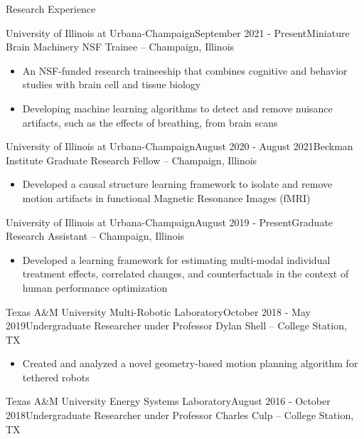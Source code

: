 \documentclass{resume} %
\begin{document}
\begin{rSection}{Research Experience}
\begin{rSubsection}{University of Illinois at Urbana-Champaign}{September 2021 - Present}{Miniature Brain Machinery NSF Trainee -- Champaign, Illinois} 

\begin{itemize}
    \item An NSF-funded research traineeship that combines cognitive and behavior studies with brain cell and tissue biology
    \item Developing machine learning algorithms to detect and remove nuisance artifacts, such as the effects of breathing, from brain scans
\end{itemize}
\end{rSubsection}
\begin{rSubsection}{University of Illinois at Urbana-Champaign}{August 2020 - August 2021}{Beckman Institute Graduate Research Fellow -- Champaign, Illinois} 

\begin{itemize}
    \item Developed a causal structure learning framework to isolate and remove motion artifacts in functional Magnetic Resonance Images (fMRI)
\end{itemize}
\end{rSubsection}
\begin{rSubsection}{University of Illinois at Urbana-Champaign}{August 2019 - Present}{Graduate Research Assistant -- Champaign, Illinois} 

\begin{itemize}
    \item Developed a learning framework for estimating multi-modal individual treatment effects, correlated changes, and counterfactuals in the context of human performance optimization
\end{itemize}
\end{rSubsection}
\begin{rSubsection}{Texas A\&M University Multi-Robotic Laboratory}{October 2018 - May 2019}{Undergraduate Researcher under Professor Dylan Shell -- College Station, TX}

\begin{itemize}
    \item Created and analyzed a novel geometry-based motion planning algorithm for tethered robots
\end{itemize}
\end{rSubsection}
\begin{rSubsection}{Texas A\&M University Energy Systems Laboratory}{August 2016 - October 2018}{Undergraduate Researcher under Professor Charles Culp -- College Station, TX}


\end{rSubsection}
\end{rSection}
\end{document}
